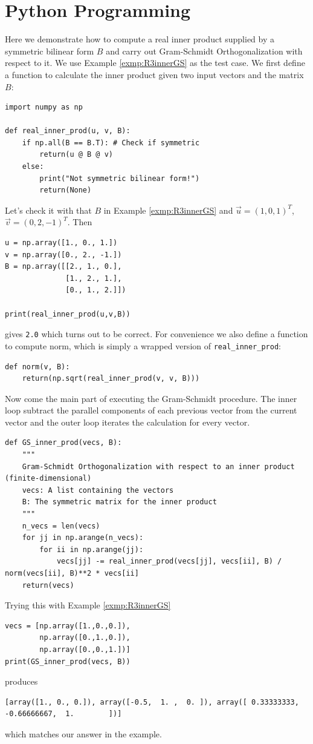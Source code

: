 \section{Python Programming}
Here we demonstrate how to compute a real inner product supplied by a symmetric bilinear form $B$ and carry out Gram-Schmidt Orthogonalization with respect to it. We use Example \ref{exmp:R3innerGS} as the test case. We first define a function to calculate the inner product given two input vectors and the matrix $B$:
\begin{lstlisting}
import numpy as np

def real_inner_prod(u, v, B):
    if np.all(B == B.T): # Check if symmetric
        return(u @ B @ v)
    else:
        print("Not symmetric bilinear form!")
        return(None)   
\end{lstlisting}
Let's check it with that $B$ in Example \ref{exmp:R3innerGS} and $\vec{u} = (1,0,1)^T$, $\vec{v} = (0,2,-1)^T$. Then
\begin{lstlisting}
u = np.array([1., 0., 1.])
v = np.array([0., 2., -1.])
B = np.array([[2., 1., 0.],  
              [1., 2., 1.],
              [0., 1., 2.]])

print(real_inner_prod(u,v,B))    
\end{lstlisting}
gives \verb|2.0| which turns out to be correct. For convenience we also define a function to compute norm, which is simply a wrapped version of \verb|real_inner_prod|:
\begin{lstlisting}
def norm(v, B):
    return(np.sqrt(real_inner_prod(v, v, B)))
\end{lstlisting}
Now come the main part of executing the Gram-Schmidt procedure. The inner loop subtract the parallel components of each previous vector from the current vector and the outer loop iterates the calculation for every vector.
\begin{lstlisting}
def GS_inner_prod(vecs, B):
    """
    Gram-Schmidt Orthogonalization with respect to an inner product (finite-dimensional)
    vecs: A list containing the vectors
    B: The symmetric matrix for the inner product
    """
    n_vecs = len(vecs)
    for jj in np.arange(n_vecs):
        for ii in np.arange(jj):
            vecs[jj] -= real_inner_prod(vecs[jj], vecs[ii], B) / norm(vecs[ii], B)**2 * vecs[ii]
    return(vecs)    
\end{lstlisting}
Trying this with Example \ref{exmp:R3innerGS}
\begin{lstlisting}
vecs = [np.array([1.,0.,0.]), 
        np.array([0.,1.,0.]), 
        np.array([0.,0.,1.])]
print(GS_inner_prod(vecs, B))
\end{lstlisting}
produces
\begin{lstlisting}
[array([1., 0., 0.]), array([-0.5,  1. ,  0. ]), array([ 0.33333333, -0.66666667,  1.        ])]    
\end{lstlisting}
which matches our answer in the example.

